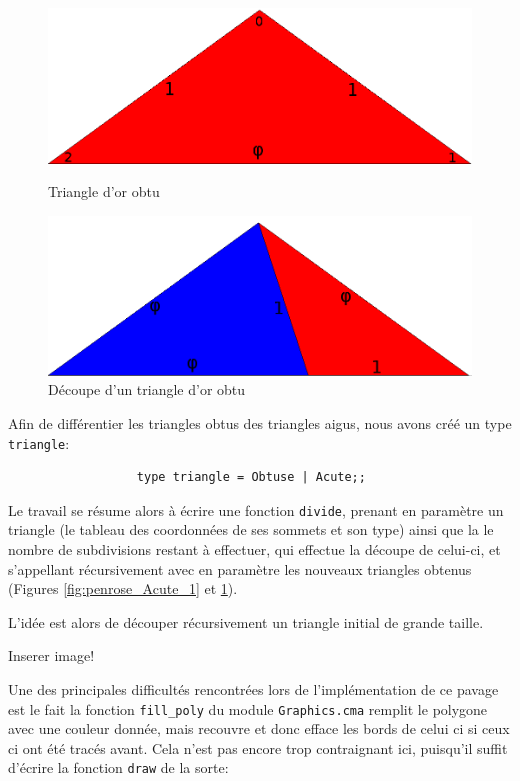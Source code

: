 \documentclass[a4paper, 11pt]{article}%
\begin{document}
\begin{figure}
			  \includegraphics[width=\linewidth]{penrose_Obtuse_0.png}
			  \caption{Triangle d'or obtu}\label{fig:penrose_Obtuse_0}
			\endminipage\hfill
			  \includegraphics[width=\linewidth]{penrose_Obtuse_1.png}
			  \caption{Découpe d'un triangle d'or obtu}\label{fig:penrose_Obtuse_1}
			\endminipage\hfill
		\end{figure}
                Afin de différentier les triangles obtus des triangles
                aigus, nous avons créé un type \texttt{triangle}:

		\begin{lstlisting}
                  type triangle = Obtuse | Acute;;
		\end{lstlisting}

                Le travail se résume alors à écrire une fonction \texttt{divide},
                prenant en paramètre un triangle (le tableau des
                coordonnées de ses sommets et son type) ainsi que la
                le nombre de subdivisions restant à effectuer, qui
                effectue la découpe de celui-ci, et s'appellant
                récursivement avec en paramètre les nouveaux triangles
                obtenus (Figures \ref{fig:penrose_Acute_1} et \ref{fig:penrose_Obtuse_1}).

                L'idée est alors de découper récursivement un triangle
                initial de grande taille. 

                Inserer image!

                Une des principales difficultés rencontrées lors de
                l'implémentation de ce pavage est le fait la fonction
                \texttt{fill\_poly} du module \texttt{Graphics.cma}
                remplit le polygone avec une couleur donnée, mais
                recouvre et donc efface les bords de celui ci si ceux
                ci ont été tracés avant. Cela n'est pas encore trop
                contraignant ici, puisqu'il suffit d'écrire la
                fonction \texttt{draw} de la sorte:
\end{document}
